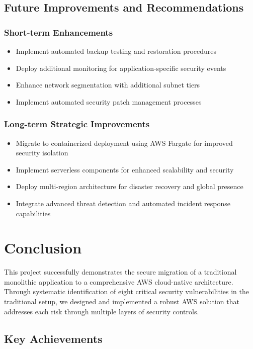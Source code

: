 \documentclass[12pt]{article}
\begin{document}
\subsection{Future Improvements and Recommendations}

\subsubsection{Short-term Enhancements}
\begin{itemize}
\item Implement automated backup testing and restoration procedures
\item Deploy additional monitoring for application-specific security events
\item Enhance network segmentation with additional subnet tiers
\item Implement automated security patch management processes
\end{itemize}

\subsubsection{Long-term Strategic Improvements}
\begin{itemize}
\item Migrate to containerized deployment using AWS Fargate for improved security isolation
\item Implement serverless components for enhanced scalability and security
\item Deploy multi-region architecture for disaster recovery and global presence
\item Integrate advanced threat detection and automated incident response capabilities
\end{itemize}

\section{Conclusion}

This project successfully demonstrates the secure migration of a traditional monolithic application to a comprehensive AWS cloud-native architecture. Through systematic identification of eight critical security vulnerabilities in the traditional setup, we designed and implemented a robust AWS solution that addresses each risk through multiple layers of security controls.

\subsection{Key Achievements}
\end{document}
